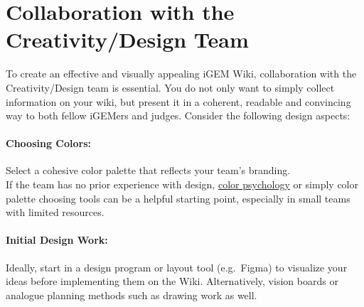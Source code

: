 
\section{Collaboration with the Creativity/Design Team } \label{sec:2.1}
To create an effective and visually appealing iGEM Wiki, collaboration with the Creativity/Design team is essential.
You do not only want to simply collect information on your wiki, but present it in a coherent, readable and convincing way to both fellow iGEMers and judges.
Consider the following design aspects:

\paragraph{Choosing Colors:} Select a cohesive color palette that reflects your team’s branding.\\
If the team has no prior experience with design, \href{https://en.wikipedia.org/wiki/Color_psychology}{color psychology}\cite{colorpsychology} or simply color palette choosing tools can be a helpful starting point, especially in small teams with limited resources.
\paragraph{Initial Design Work:} Ideally, start in a design program or layout tool (e.g.\ Figma) to visualize your ideas before implementing them on the Wiki.
Alternatively, vision boards or analogue planning methods such as drawing work as well.
